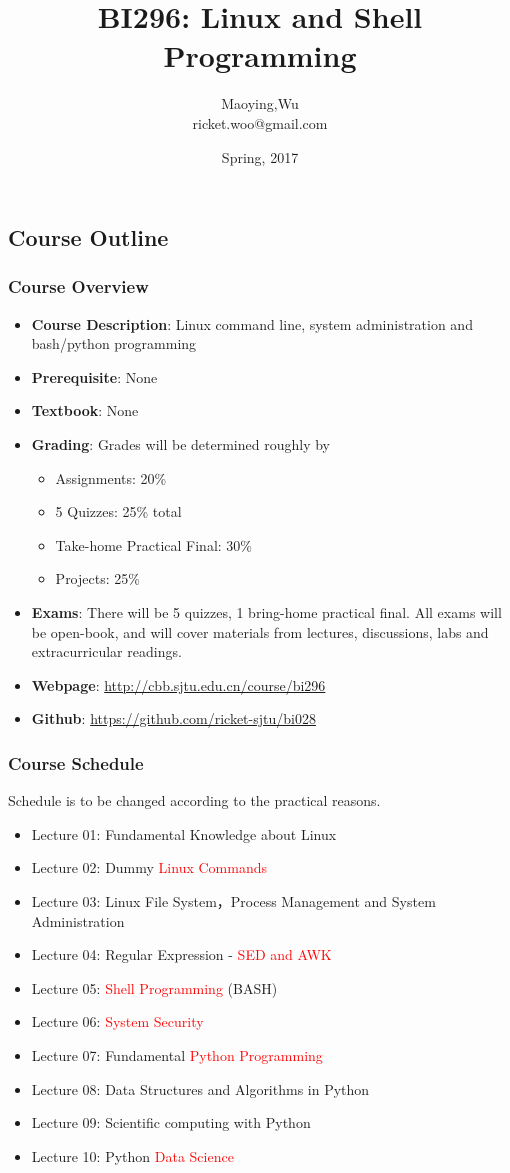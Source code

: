 \documentclass[red]{beamer}
\title[BI296]{BI296: Linux and Shell Programming}
\author[Maoying Wu]{Maoying,Wu\\
{\scriptsize ricket.woo@gmail.com}}
\institute[CBB] %
{
  \inst{}
  Dept. of Bioinformatics \& Biostatistics\\
  Shanghai Jiao Tong University
}
\date{Spring, 2017}
\begin{document}
\begin{CJK*}{UTF8}{gbsn}
\frame{\titlepage}

\section[Outline]{Course Outline}
\begin{frame}
\frametitle{Course Overview}
\begin{itemize}
	\item \textbf{Course Description}: Linux command line, system administration and 
		bash/python programming
	\item \textbf{Prerequisite}: None
    \item \textbf{Textbook}: None
    \item \textbf{Grading}: Grades will be determined roughly by
    \begin{itemize}
			\item Assignments: 20\%
        \item 5 Quizzes: 25\% total
        \item Take-home Practical Final: 30\%
        \item Projects: 25\%
    \end{itemize}
    \item \textbf{Exams}: There will be 5 quizzes, 1 bring-home practical final.
        All exams will be open-book, and will cover materials from lectures, 
			discussions, labs and extracurricular readings.

    \item \textbf{Webpage}: \url{http://cbb.sjtu.edu.cn/course/bi296}
	 \item \textbf{Github}: \url{https://github.com/ricket-sjtu/bi028}
\end{itemize}
\end{frame}

\begin{frame}
\frametitle{Course Schedule}
Schedule is to be changed according to the practical reasons.
\begin{itemize}
	\item Lecture 01: Fundamental Knowledge about Linux
	\item Lecture 02: Dummy \textcolor{red}{Linux Commands}
	\item Lecture 03: Linux File System，Process Management and System Administration
	\item Lecture 04: Regular Expression - \textcolor{red}{SED and AWK}
	\item Lecture 05: \textcolor{red}{Shell Programming} (BASH)
	\item Lecture 06: \textcolor{red}{System Security}
	\item Lecture 07: Fundamental \textcolor{red}{Python Programming}
	\item Lecture 08: Data Structures and Algorithms in Python
	\item Lecture 09: Scientific computing with Python
	\item Lecture 10: Python \textcolor{red}{Data Science}
\end{itemize}
\end{frame}



\end{CJK*}
\end{document}
